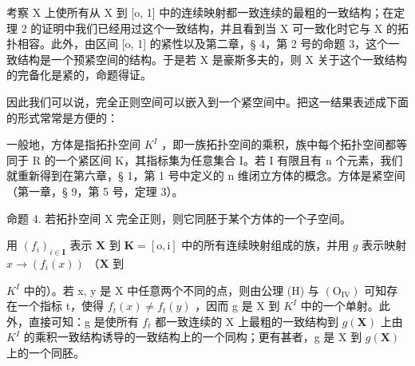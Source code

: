 考察 X 上使所有从 X 到 {[}o, 1{]} 中的连续映射都一致连续的最粗的一致结构；在定理 2 的证明中我们已经用过这个一致结构，并且看到当 X 可一致化时它与 X 的拓扑相容。此外，由区间 {[}o, 1{]} 的紧性以及第二章，§ 4，第 2 号的命题 3，这个一致结构是一个预紧空间的结构。于是若 X 是豪斯多夫的，则 X 关于这个一致结构的完备化是紧的，命题得证。

因此我们可以说，完全正则空间可以嵌入到一个紧空间中。把这一结果表述成下面的形式常常是方便的：

一般地，方体是指拓扑空间 \(K^{I}\) ，即一族拓扑空间的乘积，族中每个拓扑空间都等同于 R 的一个紧区间 K，其指标集为任意集合 I。若 I 有限且有 n 个元素，我们就重新得到在第六章，§ 1，第 1 号中定义的 n 维闭立方体的概念。方体是紧空间（第一章，§ 9，第 5 号，定理 3）。

命题 4. 若拓扑空间 X 完全正则，则它同胚于某个方体的一个子空间。

用 \((f_{i})_{i\in \mathbf{I}}\) 表示 \(\mathbf{X}\) 到 \(\mathbf{K} = [\mathrm{o},\mathrm{i}]\) 中的所有连续映射组成的族，并用 \(g\) 表示映射 \(x\to (f_i(x))\) （\(\mathbf{X}\) 到

\(K^{I}\) 中的）。若 x, y 是 X 中任意两个不同的点，则由公理 (H) 与 \((\mathrm{O}_{\mathrm{IV}})\) 可知存在一个指标 t，使得 \(f_{t}(x) \neq f_{t}(y)\) ，因而 g 是 X 到 \(K^{I}\) 中的一个单射。此外，直接可知：g 是使所有 \(f_{t}\) 都一致连续的 X 上最粗的一致结构到 \(g(\mathbf{X})\) 上由 \(K^{I}\) 的乘积一致结构诱导的一致结构上的一个同构；更有甚者，g 是 X 到 \(g(\mathbf{X})\) 上的一个同胚。

